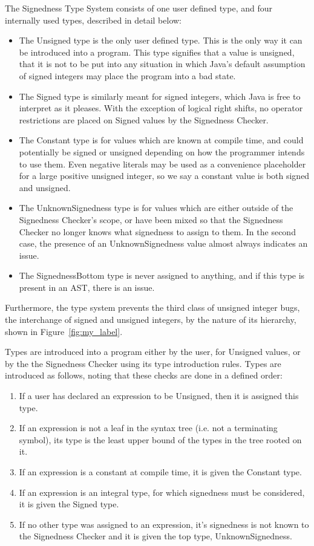 \documentclass{sig-alternate-05-2015}
\begin{document}
The Signedness Type System consists of one user defined type, and four internally used types, described in detail below:

\begin{itemize}\itemsep 0pt \parskip 0pt
  \item The Unsigned type is the only user defined type. This is the only way it can be introduced into a program. This type signifies that a value is unsigned, that it is not to be put into any situation in which Java's default assumption of signed integers may place the program into a bad state.
  \item The Signed type is similarly meant for signed integers, which Java is free to interpret as it pleases. With the exception of logical right shifts, no operator restrictions are placed on Signed values by the Signedness Checker.
  \item The Constant type is for values which are known at compile time, and could potentially be signed or unsigned depending on how the programmer intends to use them. Even negative literals may be used as a convenience placeholder for a large positive unsigned integer, so we say a constant value is both signed and unsigned.
  \item The UnknownSignedness type is for values which are either outside of the Signedness Checker's scope, or have been mixed so that the Signedness Checker no longer knows what signedness to assign to them. In the second case, the presence of an UnknownSignedness value almost always indicates an issue.
  \item The SignednessBottom type is never assigned to anything, and if this type is present in an AST, there is an issue.
\end{itemize}

Furthermore, the type system prevents the third class of unsigned integer bugs, the interchange of signed and unsigned integers, by the nature of its hierarchy, shown in Figure~\ref{fig:my_label}.

Types are introduced into a program either by the user, for Unsigned values, or by the the Signedness Checker using its type introduction rules. Types are introduced as follows, noting that these checks are done in a defined order:

\begin{enumerate}\itemsep 0pt \parskip 0pt
  \item If a user has declared an expression to be Unsigned, then it is assigned this type.
  \item If an expression is not a leaf in the syntax tree (i.e. not a terminating symbol), its type is the least upper bound of the types in the tree rooted on it.
  \item If an expression is a constant at compile time, it is given the Constant type.
  \item If an expression is an integral type, for which signedness must be considered, it is given the Signed type.
  \item If no other type was assigned to an expression, it's signedness is not known to the Signedness Checker and it is given the top type, UnknownSignedness.
\end{enumerate}
\end{document}
